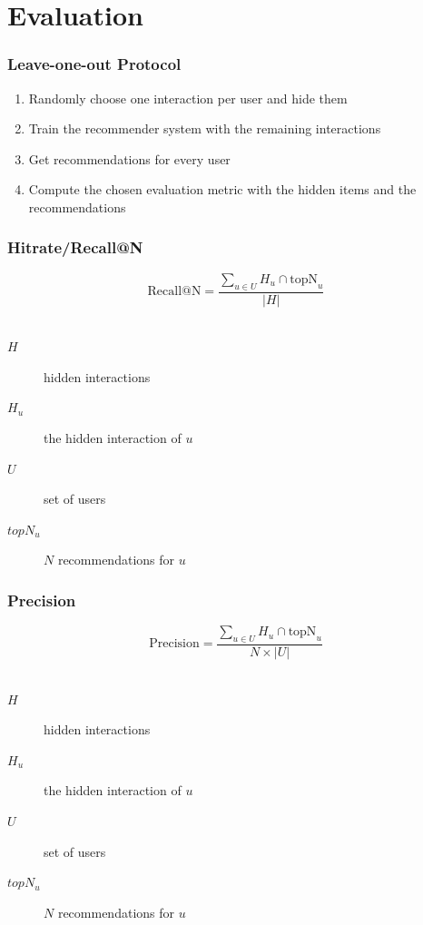 \documentclass[mathserif,svgnames]{beamer}
\begin{document}
\section{Evaluation}
\begin{frame}
    \frametitle{Leave-one-out Protocol}
    \begin{enumerate}
        \item Randomly choose one interaction per user and hide them
        \item Train the recommender system with the remaining interactions
        \item Get recommendations for every user
        \item Compute the chosen evaluation metric with the hidden items and the recommendations
    \end{enumerate}

\end{frame}
\begin{frame} 
\frametitle{Hitrate/Recall@N~\cite{Karypis:2001:EIT:502585.502627, Sarwar00applicationof}}
\begin{equation} 
\text{Recall@N}=\frac{\sum_{u \in U} H_u \cap \text{topN}_u}{|H|}
\end{equation}\\
\vspace{6.4mm}
\begin{description}
    \item[$H$] hidden interactions\\
    \item[$H_u$] the hidden interaction of $u$\\
    \item[$U$] set of users
    \item[$topN_u$] $N$ recommendations for $u$
\end{description}
\end{frame}

\begin{frame} 
\frametitle{Precision~\cite{Sarwar00applicationof}}
\begin{equation} 
\text{Precision}=\frac{\sum_{u \in U} H_u \cap \text{topN}_u}{N \times |U|}
\end{equation}\\
\vspace{6.4mm}
\begin{description}
    \item[$H$] hidden interactions\\
    \item[$H_u$] the hidden interaction of $u$\\
    \item[$U$] set of users
    \item[$topN_u$] $N$ recommendations for $u$
\end{description}
\end{frame}
\end{document}
